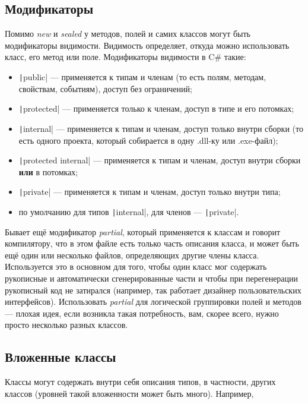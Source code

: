 \documentclass[a5paper]{article}
\begin{document}
\subsection{Модификаторы}

Помимо \textit{new} и \textit{sealed} у методов, полей и самих классов могут быть модификаторы видимости. Видимость определяет, откуда можно использовать класс, его метод или поле. Модификаторы видимости в C\# такие:

\begin{itemize}
	\item \texttt|public| --- применяется к типам и членам (то есть полям, методам, свойствам, событиям), доступ без ограничений;
	\item \texttt|protected| --- применяется только к членам, доступ в типе и его потомках;
	\item \texttt|internal| --- применяется к типам и членам, доступ только внутри сборки (то есть одного проекта, который собирается в одну .dll-ку или .exe-файл);
	\item \texttt|protected internal| --- применяется к типам и членам, доступ внутри сборки \textbf{или} в потомках;
	\item \texttt|private| --- применяется к типам и членам, доступ только внутри типа;
	\item по умолчанию для типов \texttt|internal|, для членов --- \texttt|private|.
\end{itemize}

Бывает ещё модификатор \textit{partial}, который применяется к классам и говорит компилятору, что в этом файле есть только часть описания класса, и может быть ещё один или несколько файлов, определяющих другие члены класса. Используется это в основном для того, чтобы один класс мог содержать рукописные и автоматически сгенерированные части и чтобы при перегенерации рукописный код не затирался (например, так работает дизайнер пользовательских интерфейсов). Использовать \textit{partial} для логической группировки полей и методов --- плохая идея, если возникла такая потребность, вам, скорее всего, нужно просто несколько разных классов.

\subsection{Вложенные классы}

Классы могут содержать внутри себя описания типов, в частности, других классов (уровней такой вложенности может быть много). Например,
\end{document}
